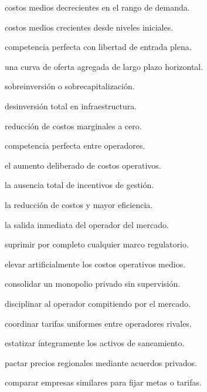 \begin{opts}
    \item costos medios decrecientes en el rango de demanda.
    \item costos medios crecientes desde niveles iniciales.
    \item competencia perfecta con libertad de entrada plena.
    \item una curva de oferta agregada de largo plazo horizontal.
\end{opts}

\begin{opts}
    \item sobreinversión o sobrecapitalización.
    \item desinversión total en infraestructura.
    \item reducción de costos marginales a cero.
    \item competencia perfecta entre operadores.
\end{opts}

\begin{opts}
    \item el aumento deliberado de costos operativos.
    \item la ausencia total de incentivos de gestión.
    \item la reducción de costos y mayor eficiencia.
    \item la salida inmediata del operador del mercado.
\end{opts}

\begin{opts}
    \item suprimir por completo cualquier marco regulatorio.
    \item elevar artificialmente los costos operativos medios.
    \item consolidar un monopolio privado sin supervisión.
    \item disciplinar al operador compitiendo por el mercado.
\end{opts}

\begin{opts}
    \item coordinar tarifas uniformes entre operadores rivales.
    \item estatizar íntegramente los activos de saneamiento.
    \item pactar precios regionales mediante acuerdos privados.
    \item comparar empresas similares para fijar metas o tarifas.
\end{opts}

